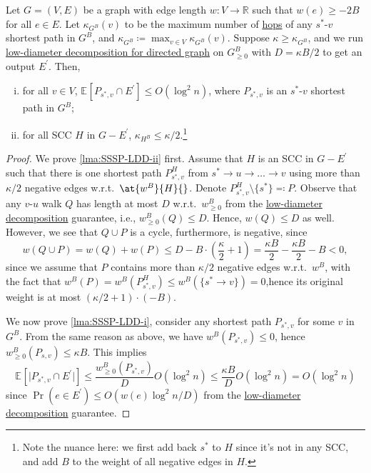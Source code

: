 \begin{lemma}\label{lma:SSSP-LDD}
	Let \(G = (V, E)\) be a graph with edge length \(w \colon V \to \mathbb{R} \) such that \(w(e) \geq -2B\) for all \(e \in E\). Let \(\kappa _{G^B}(v)\) to be the maximum number of \hyperref[not:hop]{hops} of any \(s^{\ast} \)-\(v\) shortest path in \(G^B\), and \(\kappa _{G^B}\coloneqq \max _{v \in V} \kappa _{G^B}(v)\). Suppose \(\kappa \geq \kappa _{G^B}\), and we run \hyperref[thm:directed-LDD]{low-diameter decomposition for directed graph} on \(G_{\geq 0}^B\) with \(D = \kappa B / 2\) to get an output \(E^{\prime} \). Then,
	\begin{enumerate}[(i)]
		\item\label{lma:SSSP-LDD-i} for all \(v \in V\), \(\mathbb{E}_{}[P_{s^{\ast} , v} \cap E^{\prime} ] \leq O(\log ^2 n)\), where \(P_{s^{\ast} , v}\) is an \(s^{\ast} \)-\(v\) shortest path in \(G^B\);
		\item\label{lma:SSSP-LDD-ii} for all SCC \(H\) in \(G - E^{\prime} \), \(\kappa _{H^{B} } \leq \kappa / 2\).\footnote{Note the nuance here: we first add back \(s^{\ast} \) to \(H\) since it's not in any SCC, and add \(B\) to the weight of all negative edges in \(H\).}
	\end{enumerate}
\end{lemma}
\begin{proof}
	We prove \autoref{lma:SSSP-LDD-ii} first. Assume that \(H\) is an SCC in \(G - E^{\prime} \) such that there is one shortest path \(P^H_{s^{\ast} , v}\) from \(s^{\ast} \to u \to \dots \to v\) using more than \(\kappa / 2\) negative edges w.r.t.\ \(\at{w^B}{H}{} \). Denote \(P^H_{s^{\ast} , v} \setminus \{ s^{\ast} \} \eqqcolon P\). Observe that any \(v\)-\(u\) walk \(Q\) has length at most \(D\) w.r.t.\ \(w_{\geq 0}^B\) from the \hyperref[thm:directed-LDD]{low-diameter decomposition} guarantee, i.e., \(w_{\geq 0}^B(Q) \leq D\). Hence, \(w(Q) \leq D\) as well. However, we see that \(Q \cup P\) is a cycle, furthermore, is negative, since
	\[
		w(Q \cup P)
		= w(Q) + w(P)
		\leq D - B \cdot \left( \frac{\kappa }{2} + 1\right)
		= \frac{\kappa B}{2} - \frac{\kappa B}{2} - B
		< 0,
	\]
	since we assume that \(P\) contains more than \(\kappa / 2\) negative edges w.r.t.\ \(w^B\), with the fact that \(w^B(P) = w^B(P^H_{s^{\ast} , v}) \leq w^B(\{ s^{\ast} \to v \} ) = 0\),hence its original weight is at most \((\kappa / 2 + 1) \cdot (-B)\).

	We now prove \autoref{lma:SSSP-LDD-i}, consider any shortest path \(P_{s^{\ast} , v}\) for some \(v\) in \(G^B\). From the same reason as above, we have \(w^B(P_{s^{\ast} , v}) \leq 0\), hence \(w^B_{\geq 0}(P_{s, v}) \leq \kappa B\). This implies
	\[
		\mathbb{E}_{}[\lvert P_{s^{\ast} , v} \cap E^{\prime}  \rvert ]
		\leq \frac{w_{\geq 0}^B(P_{s^{\ast} , v})}{D} O(\log ^2 n)
		\leq \frac{\kappa B}{D} O(\log ^2 n)
		= O(\log ^2 n)
	\]
	since \(\Pr(e \in E^{\prime} ) \leq O(w(e) \log ^2 n / D)\) from the \hyperref[thm:directed-LDD]{low-diameter decomposition} guarantee.
\end{proof}

